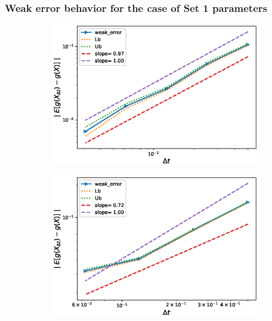 \subsubsection*{Weak error behavior for the case of Set 1 parameters}


\FloatBarrier
\begin{figure}[htb]
	\centering %
	\begin{subfigure}{0.4\textwidth}
		\includegraphics[width=\linewidth]{./figures/Heston_single_call_smooth_vol/weak_convergence/weak_convergence_order_single_call_option_heston_relative_M_4_10_6_beta_512_smooth_scheme_set1}
		\caption{}
		\label{fig:1_weak_error_smooth_vol_set1}
	\end{subfigure}\hfil %
	\begin{subfigure}{0.4\textwidth}
		\includegraphics[width=\linewidth]{./figures/Heston_single_call_ABR_moment_matching/weak_convergence/weak_convergence_order_single_call_option_heston_relative_M_1_10_7_beta_128_ABR_set1}

\end{subfigure}
\end{figure}
